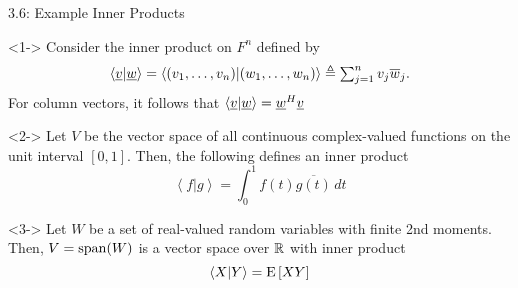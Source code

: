 \documentclass[10pt,letterpaper,english]{beamer}
\begin{document}
\begin{frame}{3.6: Example Inner Products}

\begin{example}<1->
Consider the inner product on $F^n$ defined by \vspace{-1.5mm}
\begin{equation*}
\left\langle \vecnot{v} | \vecnot{w} \right\rangle
= \left\langle (v_1, \ldots, v_n) | (w_1, \ldots, w_n) \right\rangle
\triangleq \textstyle\sum_{j=1}^n v_j \overline{w}_j. \vspace{-1.5mm}
\end{equation*}
For column vectors, it follows that $ \left\langle \underline{v} | \underline{w} \right\rangle = \underline{w}^H \underline{v} $
\end{example}

\begin{example}<2->
Let $V$ be the vector space of all continuous complex-valued functions on the unit interval $[0,1]$.
Then, the following defines an inner product \vspace{-1.5mm}
\begin{equation*}
\left\langle f | g \right\rangle
= \textstyle\int_0^1 f(t) \overline{g(t)} \, dt
\end{equation*}
\end{example}

\begin{example}<3->
Let $W$ be a set of real-valued random variables with finite 2nd moments.
Then, $V = \mathrm{span} (W)$ is a vector space over $\mathbb{R}$ with inner product \vspace{-1.5mm}
\[ \left\langle X | Y \right\rangle = \mathrm{E} \left[ XY \right] \]
\end{example}


\end{frame}
\end{document}
